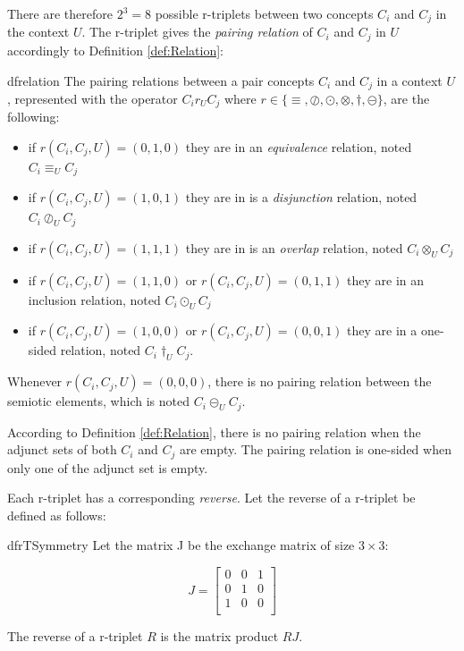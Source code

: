 There are therefore $2^3 = 8$ possible r-triplets between two concepts $C_{i}$ and $C_{j}$ in the context $U$. The r-triplet gives the \emph{pairing relation} of $C_{i}$ and $C_{j}$ in $U$ accordingly to Definition \ref{def:Relation}:

\begin{restatable}{df}{relation}
\label{def:Relation}
The pairing relations between a pair concepts $C_{i}$ and $C_{j}$ in a context $U$, represented with the operator $C_{i} r_{U} C_{j}$ where $r \in \{\equiv, \oslash, \odot, \otimes, \dagger, \circleddash \}$, are the following:

\begin{itemize}
\item if $r(C_i, C_j,U) = (0,1,0)$ they are in an \emph{equivalence} relation, noted $C_i \equiv_{U} C_j$ 
\item if $r(C_i, C_j, U) = (1,0,1)$ they are in is a \emph{disjunction} relation, noted $C_i \oslash_{U} C_j$ 
\item if $r(C_i, C_j, U) = (1,1,1)$ they are in is an \emph{overlap} relation, noted $C_i \otimes_{U} C_j$
\item if $r(C_i, C_j, U) = (1,1,0)$ or $r(C_i, C_j, U) = (0,1,1)$ they are in an inclusion relation, noted $C_i \odot_{U} C_j$
\item if $r(C_i, C_j, U) = (1,0,0)$ or $r(C_i, C_j, U) = (0,0,1)$ they are in a one-sided relation, noted $C_i \dagger_{U} C_j$.
\end{itemize}

Whenever $r(C_i, C_j, U) = (0,0,0)$, there is no pairing relation between the semiotic elements, which is noted $C_i \circleddash_{U} C_j$. 
\end{restatable}

According to Definition \ref{def:Relation}, there is no pairing relation when the adjunct sets of both $C_{i}$ and $C_{j}$ are empty. The pairing relation is one-sided when only one of the adjunct set is empty.

Each r-triplet has a corresponding \emph{reverse}. Let the reverse of a r-triplet be defined as follows: 
\begin{restatable}{df}{rTSymmetry}
\label{def:RTSymmetry}
Let the matrix J be the exchange matrix of size $3 \times 3$:

\[
J = 
\begin{bmatrix}
    0 & 0 & 1\\
    0 & 1 & 0\\
    1 & 0 & 0\\
\end{bmatrix}
\]

The reverse of a r-triplet $R$ is the matrix product $RJ$. 

\end{restatable}

